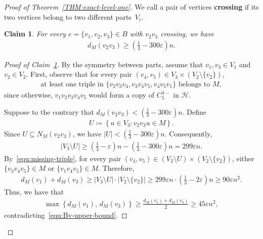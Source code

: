 \documentclass[11pt,a4paper]{article}
\newtheorem{claim}[definition]{Claim}
\theoremstyle{remark}
\begin{document}
\begin{proof}[Proof of Theorem~\ref{THM:exact-level-one}]
We call a pair of vertices \textbf{crossing} if its two vertices belong to two different parts~$V_i$.
    
    \begin{claim}\label{CLAIM:M1e-M2e}
        For every $e = \{v_1, v_2, v_3\} \in B$ with $v_2v_3$ crossing, we have 
        \begin{align*}
            d_{M}(v_2v_3) 
            \ge \left(\frac{1}{3} - 300\varepsilon\right)n. 
        \end{align*}
    \end{claim}
    \begin{proof}[Proof of Claim~\ref{CLAIM:M1e-M2e}] By the symmetry between parts, assume that $v_1,v_3\in V_1$ and $v_2\in V_2$.
        First, observe that for every pair $(v_4, v_5) \in V_3 \times (V_2 \setminus \{v_2\})$, 
        \begin{align}\label{equ:missing-triple}
            \text{at least one triple in $\{v_2v_3v_4, v_3v_4v_5, v_4v_5v_1\}$ belongs to $M$}, 
        \end{align}
        since otherwise, $v_1v_2v_3v_4v_5$ would form a copy of $C_{5}^{3-}$ in $\mathcal{H}$. 

        
        Suppose to the contrary that $d_{M}(v_2v_3) < \left(\frac{1}{3} - 300\varepsilon\right)n$. 
        Define 
        \begin{align*}
            U 
            \coloneqq \left\{u \in V_3 \colon v_2v_3u \in M\right\}. 
        \end{align*}
        Since $U\subseteq N_{M}(v_2v_3)$, we have $|U| < \left(\frac{1}{3} - 300\varepsilon\right)n$. 
        Consequently, 
        \begin{align*}
            |V_3\setminus U|
            \ge \left(\frac{1}{3} - \varepsilon\right)n - \left(\frac{1}{3} - 300\varepsilon\right)n
            = 299 \varepsilon n. 
        \end{align*}
        By~\eqref{equ:missing-triple}, for every pair $(v_4, v_5) \in (V_3\setminus U) \times (V_2 \setminus \{v_2\})$, either $\{v_3v_4v_5\} \in M$ or $\{v_1v_4v_5\} \in M$. 
        Therefore, 
        \begin{align*}
            d_{M}(v_1) + d_{M}(v_3) 
            \ge |V_3\setminus U| \cdot |V_2 \setminus \{v_2\}|
            \ge 299 \varepsilon n \cdot \left(\frac{1}{3} - 2\varepsilon\right)n 
            \ge 90 \varepsilon n^2. 
        \end{align*}
        Thus, we have that
        \begin{align*}
            \max\left\{d_{M}(v_1),\,d_{M}(v_3)\right\}
            \ge \frac{d_{M}(v_1) + d_{M}(v_3)}{2} 
            \ge 45\varepsilon n^2, 
        \end{align*}
        contradicting~\eqref{equ:Bv-upper-bound}. 
    \end{proof}


\end{proof}
\end{document}
